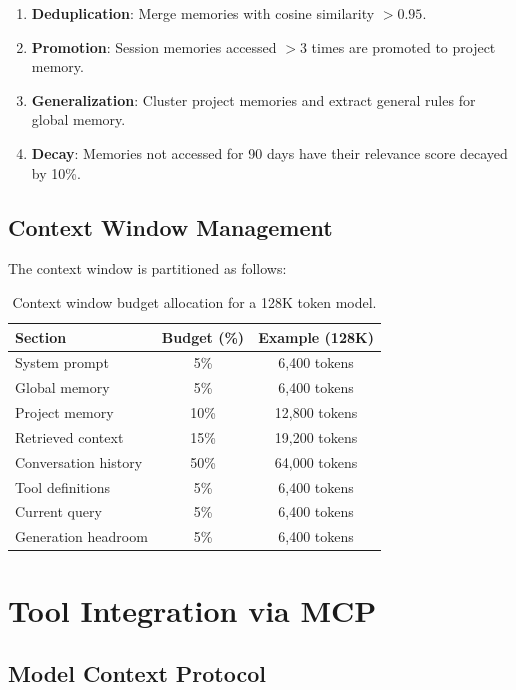 \documentclass[11pt,twocolumn]{article}
\begin{document}
\begin{enumerate}[leftmargin=1.4em]
    \item \textbf{Deduplication}: Merge memories with cosine similarity $> 0.95$.
    \item \textbf{Promotion}: Session memories accessed $> 3$ times are promoted to project memory.
    \item \textbf{Generalization}: Cluster project memories and extract general rules for global memory.
    \item \textbf{Decay}: Memories not accessed for 90 days have their relevance score decayed by 10\%.
\end{enumerate}

\subsection{Context Window Management}

The context window is partitioned as follows:

\begin{table}[H]
\centering
\begin{tabular}{lcc}
\toprule
\textbf{Section} & \textbf{Budget (\%)} & \textbf{Example (128K)} \\
\midrule
System prompt & 5\% & 6,400 tokens \\
Global memory & 5\% & 6,400 tokens \\
Project memory & 10\% & 12,800 tokens \\
Retrieved context & 15\% & 19,200 tokens \\
Conversation history & 50\% & 64,000 tokens \\
Tool definitions & 5\% & 6,400 tokens \\
Current query & 5\% & 6,400 tokens \\
Generation headroom & 5\% & 6,400 tokens \\
\bottomrule
\end{tabular}
\caption{Context window budget allocation for a 128K token model.}
\label{tab:context_budget}
\end{table}

\section{Tool Integration via MCP}
\label{sec:tools}

\subsection{Model Context Protocol}
\end{document}
